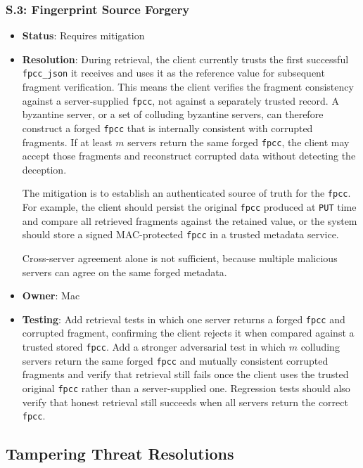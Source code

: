 \documentclass[../veristore_security_model.tex]{subfiles}
\begin{document}
\subsubsection{S.3: Fingerprint Source Forgery}
\begin{itemize}
    \item \textbf{Status}: Requires mitigation
    \item \textbf{Resolution}: During retrieval, the client currently trusts the first successful \texttt{fpcc\_json} it receives and uses it as the reference value for subsequent fragment verification. This means the client verifies the fragment consistency against a server-supplied \texttt{fpcc}, not against a separately trusted record. A byzantine server, or a set of colluding byzantine servers, can therefore construct a forged \texttt{fpcc} that is internally consistent with corrupted fragments. If at least $m$ servers return the same forged \texttt{fpcc}, the client may accept those fragments and reconstruct corrupted data without detecting the deception.
    
    The mitigation is to establish an authenticated source of truth for the \texttt{fpcc}. For example, the client should persist the original \texttt{fpcc} produced at \texttt{PUT} time and compare all retrieved fragments against the retained value, or the system should store a signed MAC-protected \texttt{fpcc} in a trusted metadata service.
    
    Cross-server agreement alone is not sufficient, because multiple malicious servers can agree on the same forged metadata.
    \item \textbf{Owner}: Mac
    \item \textbf{Testing}: Add retrieval tests in which one server returns a forged \texttt{fpcc} and corrupted fragment, confirming the client rejects it when compared against a trusted stored \texttt{fpcc}. Add a stronger adversarial test in which $m$ colluding servers return the same forged \texttt{fpcc} and mutually consistent corrupted fragments and verify that retrieval still fails once the client uses the trusted original \texttt{fpcc} rather than a server-supplied one. Regression tests should also verify that honest retrieval still succeeds when all servers return the correct \texttt{fpcc}.
\end{itemize}

\subsection{Tampering Threat Resolutions}
\end{document}
